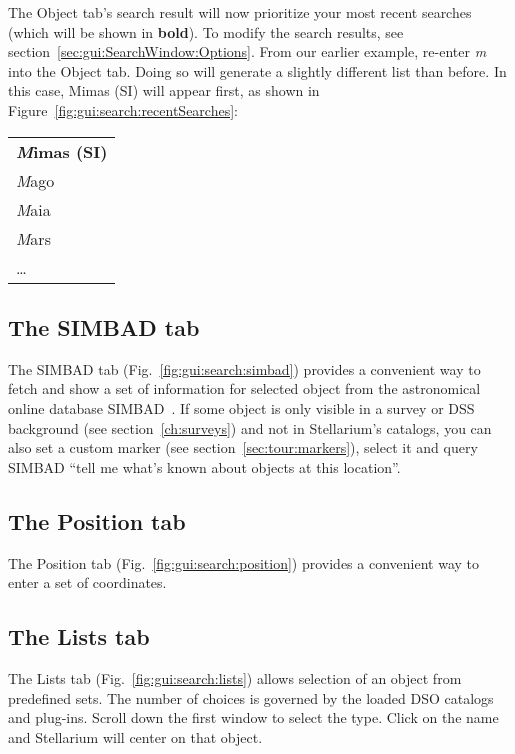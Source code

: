 \noindent The Object tab's search result will now prioritize your most recent searches
(which will be shown in \textbf{bold}).
To modify the search results, see section~\ref{sec:gui:SearchWindow:Options}.
From our earlier example, re-enter \emph{m} into the Object tab.
Doing so will generate a slightly different list than before.
In this case, Mimas (SI) will appear first, as shown in Figure~\ref{fig:gui:search:recentSearches}:
\begin{center}
\begin{tabular}{l}
        \textbf{\emph{M}imas (SI)}\\
        \emph{M}ago\\
        \emph{M}aia\\
        \emph{M}ars\\
        \ldots\\
\end{tabular}
\end{center}

\subsection{The SIMBAD tab}
\label{sec:gui:SearchWindow:SIMBAD}
The SIMBAD tab (Fig.~\ref{fig:gui:search:simbad}) provides a
convenient way to fetch and show a set of information for selected
object from the astronomical online database
SIMBAD~\citep{2000A&AS..143....9W}.  If some object is only visible in
a survey or DSS background (see section~\ref{ch:surveys}) and not in
Stellarium's catalogs, you can also set a custom marker (see
section~\ref{sec:tour:markers}), select it and query SIMBAD ``tell me
what's known about objects at this location''.

\subsection{The Position tab}
\label{sec:gui:SearchWindow:Position}
The Position tab (Fig.~\ref{fig:gui:search:position}) provides a convenient way to enter a set
of coordinates.

\subsection{The Lists tab}
\label{sec:gui:SearchWindow:Lists}
The Lists tab (Fig.~\ref{fig:gui:search:lists}) allows selection of an object from predefined
sets.  The number of choices is governed by the loaded DSO catalogs and plug-ins. 
Scroll down the first window to select the type. Click on the name
and Stellarium will center on that object.

